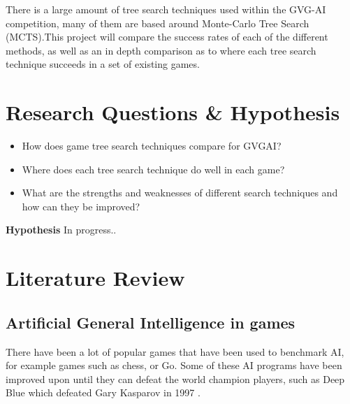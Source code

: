 \documentclass[journal]{IEEEtran}
\begin{document}
There is a large amount of tree search techniques used within the GVG-AI competition, many of them are based around Monte-Carlo Tree Search (MCTS).This project will compare the success rates of each of the different methods, as well as an in depth comparison as to where each tree search technique succeeds in a set of existing games.






\section{Research Questions \& Hypothesis}

\begin{itemize}
    \item How does game tree search techniques compare for GVGAI? 
    \item Where does each tree search technique do well in each game? 
    \item What are the strengths and weaknesses of different search techniques and how can they be improved? 
\end{itemize}

\textbf{Hypothesis}
	In progress..

\section{Literature Review}

	\subsection{Artificial General Intelligence in games}
		
		There have been a lot of popular games that have been used to benchmark AI, for example games such as chess, or Go. Some of these AI programs have been improved upon until they can defeat the world champion players, such as Deep Blue which defeated Gary Kasparov in 1997 \cite{DeepBlue, shannon1988programming, DeepBlueOverview}. 
		
\end{document}
